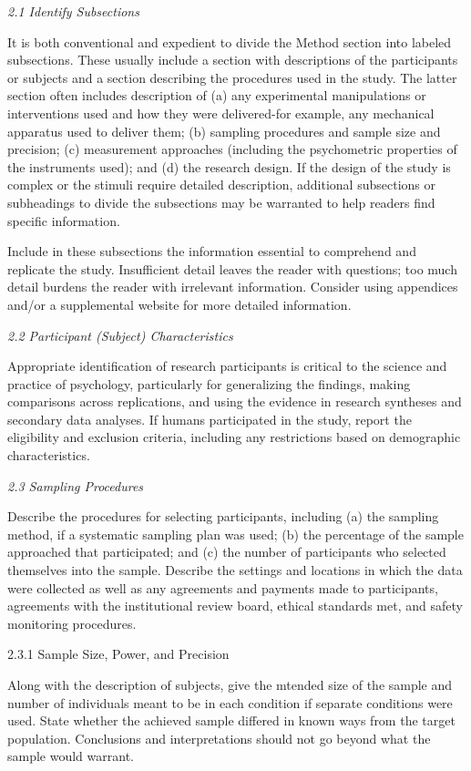 \documentclass[twoside,10.5pt]{article}%
\begin{document}
\emph{2.1 Identify Subsections}

It is both conventional and expedient to divide the Method section into labeled subsections. These usually include a section with descriptions of the participants or subjects and a section describing the procedures used in the study. The latter section often includes description of (a) any experimental manipulations or interventions used and how they were delivered-for example, any mechanical apparatus used to deliver them; (b) sampling procedures and sample size and precision; (c) measurement approaches (including the psychometric properties of the instruments used); and (d) the research design. If the design of the study is complex or the stimuli require detailed description, additional subsections or subheadings to divide the subsections may be warranted to help readers find specific information.

Include in these subsections the information essential to comprehend and replicate the study. Insufficient detail leaves the reader with questions; too much detail burdens the reader with irrelevant information. Consider using appendices and/or a supplemental website for more detailed information.

\emph{2.2 Participant (Subject) Characteristics}

Appropriate identification of research participants is critical to the science and practice of psychology, particularly for generalizing the findings, making comparisons across replications, and using the evidence in research syntheses and secondary data analyses. If humans participated in the study, report the eligibility and exclusion criteria, including any restrictions based on demographic characteristics.

\emph{2.3 Sampling Procedures}

Describe the procedures for selecting participants, including (a) the sampling method, if a systematic sampling plan was used; (b) the percentage of the sample approached that participated; and (c) the number of participants who selected themselves into the sample. Describe the settings and locations in which the data were collected as well as any agreements and payments made to participants, agreements with the institutional review board, ethical standards met, and safety monitoring procedures.

2.3.1 Sample Size, Power, and Precision

Along with the description of subjects, give the mtended size of the sample and number of individuals meant to be in each condition if separate conditions were used. State whether the achieved sample differed in known ways from the target population. Conclusions and interpretations should not go beyond what the sample would warrant.
\end{document}
